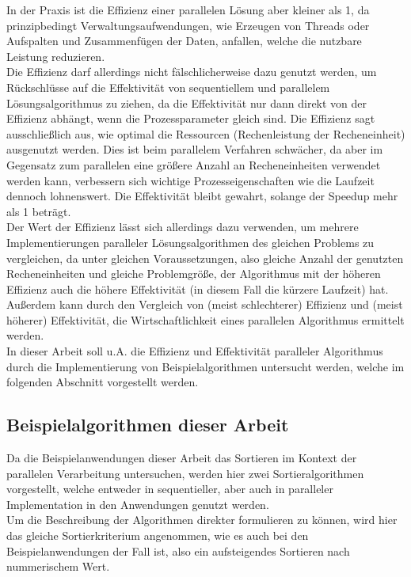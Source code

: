 In der Praxis ist die Effizienz einer parallelen Lösung aber  kleiner als 1, da prinzipbedingt Verwaltungsaufwendungen, wie Erzeugen von Threads oder Aufspalten und Zusammenfügen der Daten, anfallen, welche die nutzbare Leistung reduzieren.\\
Die Effizienz darf allerdings nicht fälschlicherweise dazu genutzt werden, um Rückschlüsse auf die Effektivität von sequentiellem und parallelem Lösungsalgorithmus zu ziehen, da die Effektivität nur dann direkt von der Effizienz abhängt, wenn die Prozessparameter gleich sind. Die Effizienz sagt ausschließlich aus, wie optimal die Ressourcen (Rechenleistung der Recheneinheit) ausgenutzt werden. Dies ist beim parallelem Verfahren schwächer, da aber im Gegensatz zum parallelen eine größere Anzahl an Recheneinheiten verwendet werden kann, verbessern sich wichtige Prozesseigenschaften wie die Laufzeit dennoch lohnenswert. Die Effektivität bleibt gewahrt, solange der Speedup mehr als 1 beträgt.\\
Der Wert der Effizienz lässt sich allerdings dazu verwenden, um mehrere Implementierungen paralleler Lösungsalgorithmen des gleichen Problems zu vergleichen, da unter gleichen Voraussetzungen, also gleiche Anzahl der genutzten Recheneinheiten und gleiche Problemgröße, der Algorithmus mit der höheren Effizienz auch die höhere Effektivität (in diesem Fall die kürzere Laufzeit) hat. Außerdem kann durch den Vergleich von (meist schlechterer) Effizienz und (meist höherer) Effektivität, die Wirtschaftlichkeit eines parallelen Algorithmus ermittelt werden.\\
In dieser Arbeit soll u.A. die Effizienz und Effektivität paralleler Algorithmus durch die Implementierung von Beispielalgorithmen untersucht werden, welche im folgenden Abschnitt vorgestellt werden.

\subsection{Beispielalgorithmen dieser Arbeit}
Da die Beispielanwendungen dieser Arbeit das Sortieren im Kontext der parallelen Verarbeitung untersuchen, werden hier zwei Sortieralgorithmen vorgestellt, welche entweder in sequentieller, aber auch in paralleler Implementation in den Anwendungen genutzt werden.\\
Um die Beschreibung der Algorithmen direkter formulieren zu können, wird hier das gleiche Sortierkriterium angenommen, wie es auch bei den Beispielanwendungen der Fall ist, also ein aufsteigendes Sortieren nach nummerischem Wert.
